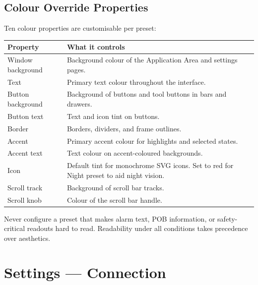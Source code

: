 \section{Colour Override Properties}

Ten colour properties are customisable per preset:

\begin{longtable}{L{3.6cm}L{10.1cm}}
\toprule
{}
\color{white}\sffamily\bfseries Property &
\color{white}\sffamily\bfseries What it controls \\
\midrule
Window background  & Background colour of the Application Area and settings pages. \\
Text               & Primary text colour throughout the interface. \\
Button background  & Background of buttons and tool buttons in bars and drawers. \\
Button text        & Text and icon tint on buttons. \\
Border             & Borders, dividers, and frame outlines. \\
Accent             & Primary accent colour for highlights and selected states. \\
Accent text        & Text colour on accent-coloured backgrounds. \\
Icon               & Default tint for monochrome SVG icons. Set to red for Night preset to aid night vision. \\
Scroll track       & Background of scroll bar tracks. \\
Scroll knob        & Colour of the scroll bar handle. \\
\bottomrule
\end{longtable}

\begin{warningbox}
Never configure a preset that makes alarm text, POB information, or safety-critical
readouts hard to read.
Readability under all conditions takes precedence over aesthetics.
\end{warningbox}

\chapter{Settings --- Connection}
\label{ch:settings-connection}


